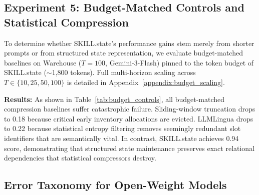 \documentclass[11pt]{article}
\begin{document}
\begin{table}[h]
\centering
\caption{Budget-Matched Controls on Warehouse ($T=100$, Gemini-3-Flash, Budget $\sim$1,800 tokens).}
\label{tab:budget_controls}
\end{table}

\subsection{Experiment 5: Budget-Matched Controls and Statistical Compression}
\label{subsec:exp5_budget_controls}

To determine whether SKILL.state's performance gains stem merely from shorter prompts or from structured state representation, we evaluate budget-matched baselines on Warehouse ($T=100$, Gemini-3-Flash) pinned to the token budget of SKILL.state ($\sim$1,800 tokens). Full multi-horizon scaling across $T \in \{10, 25, 50, 100\}$ is detailed in Appendix~\ref{appendix:budget_scaling}.

\noindent\textbf{Results:} As shown in Table~\ref{tab:budget_controls}, all budget-matched compression baselines suffer catastrophic failure. Sliding-window truncation drops to 0.18 because critical early inventory allocations are evicted. LLMLingua drops to 0.22 because statistical entropy filtering removes seemingly redundant slot identifiers that are semantically vital. In contrast, SKILL.state achieves 0.94 score, demonstrating that structured state maintenance preserves exact relational dependencies that statistical compressors destroy.

\subsection{Error Taxonomy for Open-Weight Models}
\label{subsec:error_taxonomy}
\end{document}
